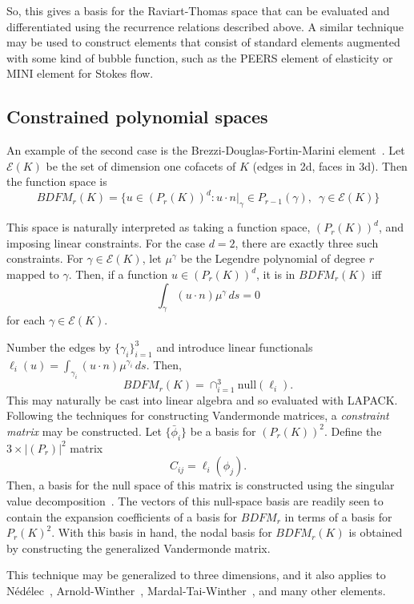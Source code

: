 So, this gives a basis for the Raviart-Thomas space that can be
evaluated and differentiated using the recurrence relations described
above.  A similar technique may be used to construct elements that
consist of standard elements augmented with some kind of bubble
function, such as 
the PEERS element of elasticity or MINI element for Stokes flow.


\subsection{Constrained polynomial spaces}
An example of the second case is the Brezzi-Douglas-Fortin-Marini
element~\cite{BreFor91}.  Let \( \mathcal{E}(K) \) be the set of dimension one
cofacets of \( K \) (edges in 2d, faces in 3d).  Then the function
space is
\[
BDFM_r(K) = \{ u \in (P_r(K))^d : u\cdot n|_{\gamma} \in
P_{r-1}(\gamma), \, \, \, \gamma \in \mathcal{E}(K) \}
\]

This space is naturally interpreted as taking a function space,
\( (P_r(K))^d \), and imposing linear constraints.  For the case \( d
= 2 \), there are exactly three such constraints.  For \( \gamma
\in \mathcal{E}(K) \), let \( \mu^\gamma \) be the Legendre polynomial
of degree \( r \) mapped to \( \gamma \).  Then, if a function \( u
\in (P_r(K))^d \), it is in \( BDFM_r(K) \) iff
\[
\int_{\gamma} ( u \cdot n ) \mu^\gamma \, ds = 0
\]
for each \( \gamma \in \mathcal{E}(K) \).  

Number the edges by \( \{ \gamma_i \}_{i=1}^3 \) and introduce
linear functionals \\
\( \ell_i(u) = \int_{\gamma_i} (u \cdot n)
\mu^{\gamma_i} \, ds \).  Then,
\[
BDFM_r(K) = \cap_{i=1}^3 \mathrm{null}(\ell_i).
\]
This may naturally be cast into linear algebra and so evaluated with
LAPACK.  Following the
techniques for constructing Vandermonde matrices, a \emph{constraint
  matrix} may be constructed.  Let \( \{ \bar{\phi}_i \} \) be a basis
for \( (P_r(K))^2 \).  Define the \( 3 \times |(P_r)|^2 \) matrix
\[
C_{ij} = \ell_i( \phi_j ).
\]
Then, a basis for the null space of this matrix is constructed using
the singular value decomposition~\cite{GolVan96}.  The vectors of this
null-space basis are readily seen to contain the expansion
coefficients of a basis for \( BDFM_r \) in terms of a basis for
\( P_r(K)^2 \).  With this basis in hand,
the nodal basis for \( BDFM_r(K) \) is obtained by constructing the
generalized Vandermonde matrix.

This technique may be generalized to three dimensions, and it also
applies to N\'ed\'elec~\cite{Ned80}, Arnold-Winther~\cite{ArnWin02},
Mardal-Tai-Winther~\cite{MarTai02}, 
and many other elements.

